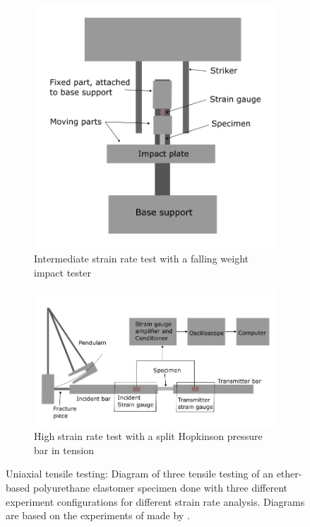 \begin{figure}
\begin{subfigure}[b]{0.45\textwidth}
        \includegraphics[width=\textwidth]{Images/chapter1/uniaxialintermediate.png}
        \caption{Intermediate strain rate test with a falling weight impact tester}
        \label{fig:subfiginter}
        \end{subfigure}
        \vspace{0.5cm}
        \begin{subfigure}[b]{0.7\textwidth}
        \centering
        \includegraphics[width=\textwidth]{Images/chapter1/uniaxialhigh.png}
        \caption{High strain rate test with a split Hopkinson pressure bar in tension}
        \label{fig:subfighigh}
        \end{subfigure}  
        \hspace{0.3cm}

        \caption[Uniaxial tensile testing of ether-based polyurethane]{Uniaxial tensile testing: Diagram of three tensile testing of an ether-based polyurethane elastomer specimen done with three different experiment configurations for different strain rate analysis. Diagrams are based on the experiments of made by \citet{Kanyanta2010}.}
        \label{fig:uniaxialkan}
\end{figure}

